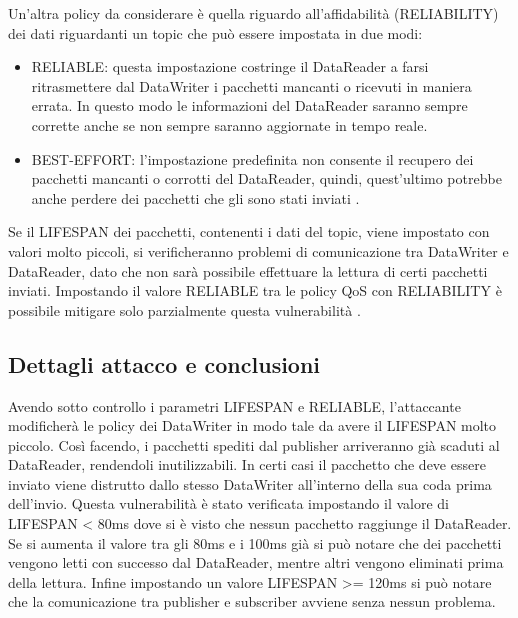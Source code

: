 Un'altra policy da considerare è quella riguardo all'affidabilità
(RELIABILITY) dei dati riguardanti un topic che può essere impostata in due
modi:
\begin{itemize}
    \item RELIABLE: questa impostazione costringe il DataReader a farsi
    ritrasmettere dal DataWriter i pacchetti mancanti o ricevuti in maniera errata.
    In questo modo le informazioni del DataReader saranno sempre corrette anche
    se non sempre saranno aggiornate in tempo reale.
    \item BEST-EFFORT: l'impostazione predefinita non consente il recupero
    dei pacchetti mancanti o corrotti
    del DataReader, quindi, quest'ultimo potrebbe anche perdere dei pacchetti 
    che gli sono stati inviati \cite{dds1.4}.
\end{itemize}
Se il LIFESPAN dei pacchetti, contenenti i dati del topic,
viene impostato con valori molto piccoli, si verificheranno problemi di comunicazione
tra DataWriter e DataReader, dato che non sarà possibile effettuare la lettura di 
certi pacchetti inviati. Impostando il valore RELIABLE tra le policy QoS con
RELIABILITY è possibile mitigare 
solo parzialmente questa vulnerabilità
\cite{DBLP:conf/malware/MichaudDL18}.



\subsection{Dettagli attacco e conclusioni}
Avendo sotto controllo i parametri LIFESPAN e RELIABLE, l'attaccante modificherà le
policy dei DataWriter in modo tale da avere il LIFESPAN molto piccolo. Così
facendo, i pacchetti spediti dal publisher arriveranno già scaduti al DataReader,
rendendoli inutilizzabili. In certi casi il pacchetto che deve essere inviato
viene distrutto dallo stesso DataWriter all'interno della sua coda prima dell'invio. 
Questa vulnerabilità è stato verificata impostando il valore di
LIFESPAN < 80ms dove si è visto che nessun pacchetto raggiunge il DataReader.
Se si aumenta il valore tra gli 80ms e i 100ms già si può notare che dei pacchetti
vengono letti con successo dal DataReader, mentre altri vengono eliminati prima
della lettura. Infine impostando un valore LIFESPAN >= 120ms si può notare che
la comunicazione tra publisher e subscriber avviene senza nessun problema.

